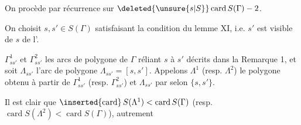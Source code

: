 On procède par récurrence sur $\deleted{\unsure{s|S}}\mathop{\mathrm{card}} S(\Gamma)-2$.

On choisit $s,s'\in S(\Gamma)$ satisfaisant la condition du lemme XI, i.e. $s'$ est visible de $s$ de l'.

  $\Gamma^{1}_{ss'}$ et $\Gamma^{2}_{ss'}$  les  arcs de polygone de $\Gamma$ réliant $s$ à $s'$ décrits dans la Remarque 1, et soit $\Lambda_{ss'}$ l'arc de polygone $\Lambda_{ss'}=[s,s']$. Appelons $\Lambda^{1}$  (resp. $\Lambda^{2}$) le polygone obtenu à partir de $\Gamma^{1}_{ss'}$ (resp. $\Gamma^{2}_{ss'}$) et $\Lambda_{ss'}$ par  selon $\{s,s'\}$.

Il est clair que $\inserted{\mathrm{card}}\,S(\Lambda^{1})<\mathop{\mathrm{card}} S(\Gamma)$ (resp. $\mathop{\mathrm{card}} S(\Lambda^{2})<\mathop{\mathrm{card}} S(\Gamma)$), autrement
